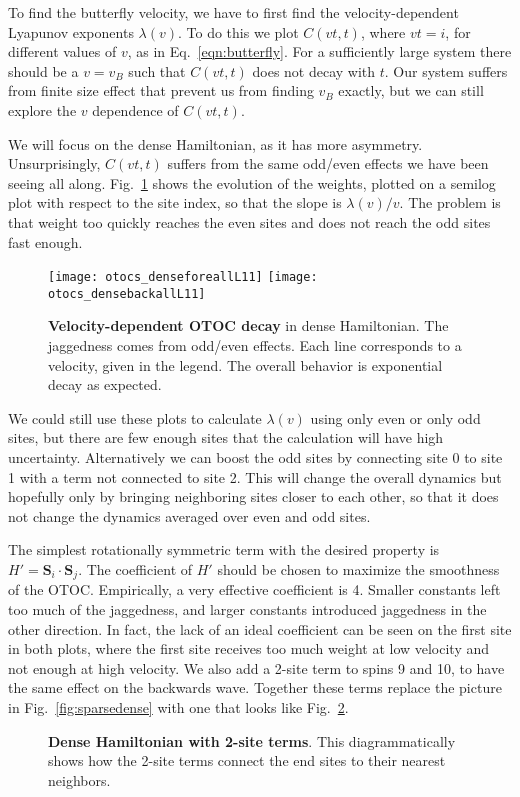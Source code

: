 To find the butterfly velocity, we have to first find the velocity-dependent Lyapunov exponents $\lambda(v)$. To do this we plot $C(vt,t)$, where $vt=i$, for different values of $v$, as in Eq.~\ref{eqn:butterfly}. For a sufficiently large system there should be a $v=v_B$ such that $C(vt,t)$ does not decay with $t$. Our system suffers from finite size effect that prevent us from finding $v_B$ exactly, but we can still explore the $v$ dependence of $C(vt,t)$.

We will focus on the dense Hamiltonian, as it has more asymmetry. Unsurprisingly, $C(vt,t)$ suffers from the same odd/even effects we have been seeing all along. Fig.~\ref{fig:otocs_denseforeallL11} shows the evolution of the weights, plotted on a semilog plot with respect to the site index, so that the slope is $\lambda(v)/v$. The problem is that weight too quickly reaches the even sites and does not reach the odd sites fast enough.

\begin{figure}
	\centering
	\texttt{[image: otocs\_denseforeallL11]}
	\texttt{[image: otocs\_densebackallL11]}
	\caption{\textbf{Velocity-dependent OTOC decay} in dense Hamiltonian. The jaggedness comes from odd/even effects. Each line corresponds to a velocity, given in the legend. The overall behavior is exponential decay as expected.}
	\label{fig:otocs_denseforeallL11}
\end{figure}

We could still use these plots to calculate $\lambda(v)$ using only even or only odd sites, but there are few enough sites that the calculation will have high uncertainty. Alternatively we can boost the odd sites by connecting site 0 to site 1 with a term not connected to site 2. This will change the overall dynamics but hopefully only by bringing neighboring sites closer to each other, so that it does not change the dynamics averaged over even and odd sites.

The simplest rotationally symmetric term with the desired property is $H'=\bm{S}_i\cdot\bm{S}_j$. The coefficient of $H'$ should be chosen to maximize the smoothness of the OTOC. Empirically, a very effective coefficient is 4. Smaller constants left too much of the jaggedness, and larger constants introduced jaggedness in the other direction. In fact, the lack of an ideal coefficient can be seen on the first site in both plots, where the first site receives too much weight at low velocity and not enough at high velocity. We also add a 2-site term to spins 9 and 10, to have the same effect on the backwards wave. Together these terms replace the picture in Fig.~\ref{fig:sparsedense} with one that looks like Fig.~\ref{fig:densepert}.
\begin{figure}
	\centering
	
	\caption{\textbf{Dense Hamiltonian with 2-site terms}. This diagrammatically shows how the 2-site terms connect the end sites to their nearest neighbors.}
	\label{fig:densepert}
\end{figure}

